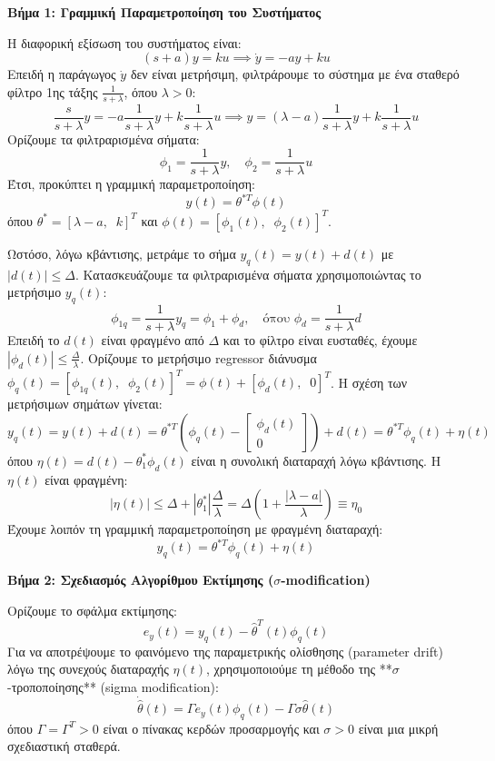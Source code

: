 \documentclass[a4paper,11pt]{article}
\begin{document}
\begin{answer}
\textbf{Βήμα 1: Γραμμική Παραμετροποίηση του Συστήματος}

Η διαφορική εξίσωση του συστήματος είναι:
\[ (s+a) y = k u \implies \dot{y} = -a y + k u \]
Επειδή η παράγωγος $\dot{y}$ δεν είναι μετρήσιμη, φιλτράρουμε το σύστημα με ένα σταθερό φίλτρο 1ης τάξης $\frac{1}{s+\lambda}$, όπου $\lambda > 0$:
\[ \frac{s}{s+\lambda} y = -a \frac{1}{s+\lambda} y + k \frac{1}{s+\lambda} u \implies y = (\lambda - a) \frac{1}{s+\lambda} y + k \frac{1}{s+\lambda} u \]
Ορίζουμε τα φιλτραρισμένα σήματα:
\[ \phi_1 = \frac{1}{s+\lambda} y, \quad \phi_2 = \frac{1}{s+\lambda} u \]
Έτσι, προκύπτει η γραμμική παραμετροποίηση:
\[ y(t) = \theta^{*T} \phi(t) \]
όπου $\theta^* = [\lambda - a, \;\; k]^T$ και $\phi(t) = [\phi_1(t), \;\; \phi_2(t)]^T$.

Ωστόσο, λόγω κβάντισης, μετράμε το σήμα $y_q(t) = y(t) + d(t)$ με $|d(t)| \le \Delta$.
Κατασκευάζουμε τα φιλτραρισμένα σήματα χρησιμοποιώντας το μετρήσιμο $y_q(t)$:
\[ \phi_{1q} = \frac{1}{s+\lambda} y_q = \phi_1 + \phi_d, \quad \text{όπου } \phi_d = \frac{1}{s+\lambda} d \]
Επειδή το $d(t)$ είναι φραγμένο από $\Delta$ και το φίλτρο είναι ευσταθές, έχουμε $|\phi_d(t)| \le \frac{\Delta}{\lambda}$.
Ορίζουμε το μετρήσιμο regressor διάνυσμα $\phi_q(t) = [\phi_{1q}(t), \;\; \phi_2(t)]^T = \phi(t) + [\phi_d(t), \;\; 0]^T$.
Η σχέση των μετρήσιμων σημάτων γίνεται:
\[ y_q(t) = y(t) + d(t) = \theta^{*T} \left( \phi_q(t) - \begin{bmatrix} \phi_d(t) \\ 0 \end{bmatrix} \right) + d(t) = \theta^{*T} \phi_q(t) + \eta(t) \]
όπου $\eta(t) = d(t) - \theta_1^* \phi_d(t)$ είναι η συνολική διαταραχή λόγω κβάντισης. Η $\eta(t)$ είναι φραγμένη:
\[ |\eta(t)| \le \Delta + |\theta_1^*| \frac{\Delta}{\lambda} = \Delta \left( 1 + \frac{|\lambda - a|}{\lambda} \right) \equiv \eta_0 \]
Έχουμε λοιπόν τη γραμμική παραμετροποίηση με φραγμένη διαταραχή:
\[ y_q(t) = \theta^{*T} \phi_q(t) + \eta(t) \]

\textbf{Βήμα 2: Σχεδιασμός Αλγορίθμου Εκτίμησης ($\sigma$-modification)}

Ορίζουμε το σφάλμα εκτίμησης:
\[ e_y(t) = y_q(t) - \hat{\theta}^T(t) \phi_q(t) \]
Για να αποτρέψουμε το φαινόμενο της παραμετρικής ολίσθησης (parameter drift) λόγω της συνεχούς διαταραχής $\eta(t)$, χρησιμοποιούμε τη μέθοδο της **$\sigma$-τροποποίησης** (sigma modification):
\[ \dot{\hat{\theta}}(t) = \Gamma e_y(t) \phi_q(t) - \Gamma \sigma \hat{\theta}(t) \]
όπου $\Gamma = \Gamma^T > 0$ είναι ο πίνακας κερδών προσαρμογής και $\sigma > 0$ είναι μια μικρή σχεδιαστική σταθερά.


\end{answer}
\end{document}
